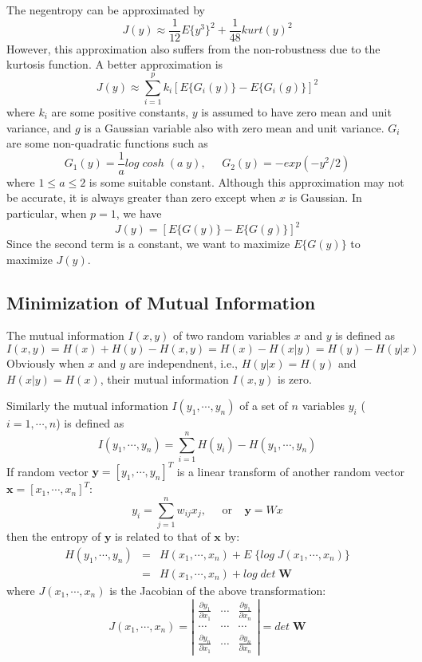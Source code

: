 \documentclass[12pt, a4paper, onecolumn]{IEEEtran}
\begin{document}
\begin{itemize}
The negentropy can be approximated by
\[	J(y)\approx \frac{1}{12}E\{y^3\}^2+\frac{1}{48} kurt(y)^2	\]
However, this approximation also suffers from the non-robustness due to
the kurtosis function. A better approximation is
\[	J(y)\approx \sum_{i=1}^p k_i [ E\{G_i(y)\}-E\{G_i(g)\}]^2 	\]
where $k_i$ are some positive constants, $y$ is assumed to have zero mean
and unit variance, and $g$ is a Gaussian variable also with zero mean and
unit variance. $G_i$ are some non-quadratic functions such as
\[ G_1(y)=\frac{1}{a} log\;cosh\;(a \;y),\;\;\;\;\;G_2(y) =-exp(-y^2/2) \]
where $1 \le a \le 2$ is some suitable constant. Although this approximation
may not be accurate, it is always greater than zero except when $x$ is
Gaussian. In particular, when $p=1$, we have
\[	J(y)=[E\{ G(y)\}-E\{G(g)\}]^2 	\]
Since the second term is a constant, we want to maximize $E\{ G(y) \}$ to
maximize $J(y)$.

\end{itemize}

\subsection*{Minimization of Mutual Information}

The mutual information $I(x,y)$ of two random variables $x$ and $y$ is
defined as
\[	I(x,y)=H(x)+H(y)-H(x,y)=H(x)-H(x|y)=H(y)-H(y|x)		\]
Obviously when $x$ and $y$ are independnent, i.e., $H(y|x)=H(y)$ and
$H(x|y)=H(x)$, their mutual information $I(x,y)$ is zero.

Similarly the mutual information $I(y_1,\cdots,y_n)$ of a set of $n$
variables $y_i$ ($i=1,\cdots,n$) is defined as
\[	I(y_1,\cdots,y_n)=\sum_{i=1}^n H(y_i)-H(y_1,\cdots,y_n)	\]
If random vector ${\mathbf y}=[y_1,\cdots,y_n]^T$ is a linear transform of
another random vector ${\mathbf x}=[x_1,\cdots,x_n]^T$:
\[	y_i=\sum_{j=1}^n w_{ij} x_j,\;\;\;\;\;\mbox{or}\;\;\;\;{\mathbf y=Wx}	\]
then the entropy of ${\mathbf y}$ is related to that of ${\mathbf x}$ by:
\begin{eqnarray}
H(y_1,\cdots,y_n)&=&H(x_1,\cdots,x_n)+E\;\{ log\;J(x_1,\cdots,x_n)\}
	\nonumber \\
	&=& H(x_1,\cdots,x_n)+ log\;det\; {\mathbf W}
	\nonumber
\end{eqnarray}
where $J(x_1,\cdots,x_n)$ is the Jacobian of the above transformation:
\[	J(x_1,\cdots,x_n)=\left| \begin{array}{ccc}
\frac{\partial y_1}{\partial x_1} & \cdots &\frac{\partial y_1}{\partial x_n} \\
\cdots & \cdots & \cdots \\
\frac{\partial y_n}{\partial x_1} & \cdots &\frac{\partial y_n}{\partial x_n}
\end{array} \right|
=det\;{\mathbf W}	\]
\end{document}
